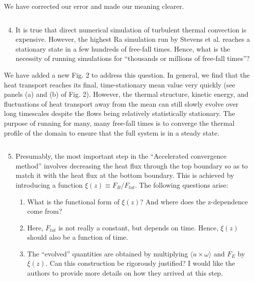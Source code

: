 \documentclass[aps, 11pt, singlecolumn]{revtex4-1} %
\begin{document}
\begin{singlespace}
We have corrected our error and made our meaning clearer.

\begin{myquotation}
$\,$\\\vspace{-1.25cm}
\begin{enumerate}
\setcounter{enumi}{3}
\item It is true that direct numerical simulation of turbulent thermal convection is expensive. However, the highest Ra simulation run by Stevens et al. reaches a stationary state in a few hundreds of free-fall times. Hence, what is the necessity of running simulations for ``thousands or millions of free-fall times''?
\end{enumerate}
\end{myquotation}
We have added a new Fig. 2 to address this question. In general, we find that
the heat transport reaches its final, time-stationary mean
value very quickly (see panels (a) and (b) of Fig. 2). However, the thermal 
structure, kinetic energy, and fluctuations of heat transport away from the mean
can still slowly evolve over long timescales
despite the flows being relatively statistically stationary. The purpose of
running for many, many free-fall times is to converge the thermal profile of
the domain to ensure that the full system is in a steady state.

\begin{myquotation}
$\,$\\\vspace{-1.25cm}
\begin{enumerate}
\setcounter{enumi}{4}
\item Presumably, the most important step in the “Accelerated convergence method” involves decreasing the heat flux through the top boundary so as to match it with the heat flux at the bottom boundary. This is achieved by introducing a function $\xi(z) \equiv  F_B/F_{tot}$. The following questions arise:
\begin{enumerate}
\item What is the functional form of $\xi(z)$? And where does the z-dependence come from?
\item Here, $F_{tot}$ is not really a constant, but depends on time. Hence, $\xi(z)$ should also be a function of time.
\item The ``evolved'' quantities are obtained by multiplying $\langle u \times \omega \rangle$ and $F_E$ by $\xi(z)$. Can this construction be rigorously justified? I would like the authors to provide more details on how they arrived at this step.
\end{enumerate}
\end{enumerate}
\end{myquotation}


\end{singlespace}
\end{document}
